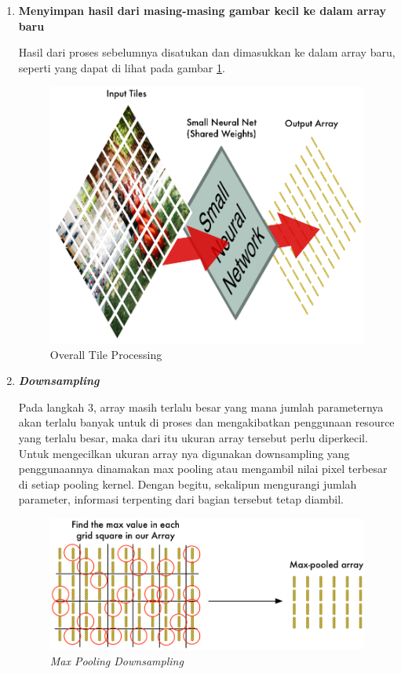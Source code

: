 \begin{enumerate}
	\item \textbf{Menyimpan hasil dari masing-masing gambar kecil ke dalam array baru}
	
	Hasil dari proses sebelumnya disatukan dan dimasukkan ke dalam array baru, seperti yang dapat di lihat pada gambar \ref{fig:outputarray}.
	
		\begin{figure}[ht]
		\centering
		
		\includegraphics[width=0.7\columnwidth]{gambar/outputarray.png}
		
		\caption{Overall Tile Processing \citep{cit:kuda}}
		\label{fig:outputarray}
	\end{figure}
	
	\item \textit{\textbf{Downsampling}}
	
	Pada langkah 3, array masih terlalu besar yang mana jumlah parameternya akan terlalu banyak untuk di proses dan mengakibatkan penggunaan resource yang terlalu besar, maka dari itu ukuran array tersebut perlu diperkecil. Untuk mengecilkan ukuran array nya digunakan downsampling yang penggunaannya dinamakan max pooling atau mengambil nilai pixel terbesar di setiap pooling kernel. Dengan begitu, sekalipun mengurangi jumlah parameter, informasi terpenting dari bagian tersebut tetap diambil.
	
	\begin{figure}[ht]
		\centering
		
		\includegraphics[width=0.9\columnwidth]{gambar/maxpooling.png}
		
		\caption{\emph{Max Pooling Downsampling} \citep{cit:kuda}}
		\label{fig:maxpooling}
	\end{figure}
	
\end{enumerate}


